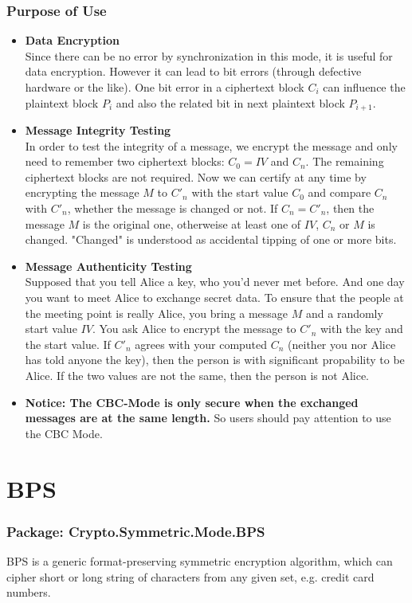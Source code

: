 \subsubsection*{Purpose of Use}
\begin{itemize}
\item \textbf{Data Encryption}\\
Since there can be no error by synchronization in this mode, it is useful for data encryption. However it can lead to bit errors (through defective hardware or the like). One bit error in a ciphertext block $C_i$ can influence the plaintext block $P_i$ and also the related bit in next plaintext block $P_{i+1}$.
\item \textbf{Message Integrity Testing}\\
In order to test the integrity of a message, we encrypt the message and only need to remember two ciphertext blocks: $C_0=IV$ and $C_n$. The remaining ciphertext blocks are not required. Now we can certify at any time by encrypting the message $M$ to $C'_n$ with the start value $C_0$ and compare $C_n$ with $C'_n$, whether the message is changed or not. If $C_n=C'_n$, then the message $M$ is the original one, otherweise at least one of $IV$, $C_n$ or $M$ is changed. "Changed" is understood as accidental tipping of one or more bits.
\item \textbf{Message Authenticity Testing}\\
Supposed that you tell Alice a key, who you'd never met before. And one day you want to meet Alice to exchange secret data. To ensure that the people at the meeting point is really Alice, you bring a message $M$ and a randomly start value $IV$. You ask Alice to encrypt the message to $C'_n$ with the key and the start value. If $C'_n$ agrees with your computed $C_n$ (neither you nor Alice has told anyone the key), then the person is with significant propability to be Alice. If the two values are not the same, then the person is not Alice.
\item \textbf{Notice: The CBC-Mode is only secure when the exchanged messages are at the same length.} So users should pay attention to use the CBC Mode.
\end{itemize}
\section{BPS}
\subsubsection*{Package: Crypto.Symmetric.Mode.BPS}
BPS is a generic format-preserving symmetric encryption algorithm, which can cipher short or long string of characters from any given set, e.g. credit card numbers.
